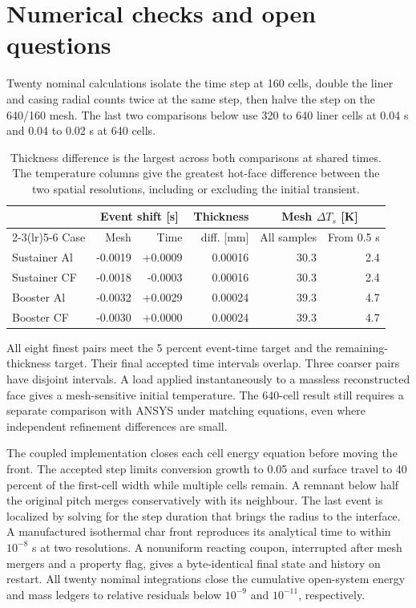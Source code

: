 \clearpage\section{Numerical checks and open questions}
Twenty nominal calculations isolate the time step at 160 cells, double the
liner and casing radial counts twice at the same step, then halve the step on
the 640/160 mesh. The last two comparisons below use 320 to 640 liner cells at
0.04 s and 0.04 to 0.02 s at 640 cells.
\begin{table}[H]\centering\begin{tabular}{lrr r rr}\toprule
 & \multicolumn{2}{c}{Event shift [s]} & Thickness & \multicolumn{2}{c}{Mesh $\Delta T_s$ [K]}\\
\cmidrule(lr){2-3}\cmidrule(lr){5-6}
Case & Mesh & Time & diff. [mm] & All samples & From 0.5 s\\\midrule
Sustainer Al & -0.0019 & +0.0009 & 0.00016 & 30.3 & 2.4 \\
Sustainer CF & -0.0018 & -0.0003 & 0.00016 & 30.3 & 2.4 \\
Booster Al & -0.0032 & +0.0029 & 0.00024 & 39.3 & 4.7 \\
Booster CF & -0.0030 & +0.0000 & 0.00024 & 39.3 & 4.7 \\
\bottomrule\end{tabular}
\caption{Thickness difference is the largest across both comparisons at shared
times. The temperature columns give the greatest hot-face difference between
the two spatial resolutions, including or excluding the initial transient.}
\end{table}
All eight finest pairs meet the 5 percent event-time target and the
remaining-thickness target. Their final accepted time intervals overlap.
Three coarser pairs have disjoint intervals. A load applied instantaneously
to a massless reconstructed face gives a mesh-sensitive initial temperature.
The 640-cell result still requires a separate comparison with ANSYS under
matching equations, even where independent refinement differences are small.

The coupled implementation closes each cell energy equation before moving the
front. The accepted step limits conversion growth to 0.05 and surface travel
to 40 percent of the first-cell width while multiple cells remain. A remnant
below half the original pitch merges conservatively with its neighbour.
The last event is localized by solving for the step duration that brings
the radius to the interface. A manufactured isothermal char front reproduces
its analytical time to within $10^{-8}$ s at two resolutions. A nonuniform
reacting coupon, interrupted after mesh mergers and a property flag, gives
a byte-identical final state and history on restart. All twenty nominal
integrations close the cumulative open-system energy and mass ledgers to
relative residuals below $10^{-9}$ and $10^{-11}$, respectively.

